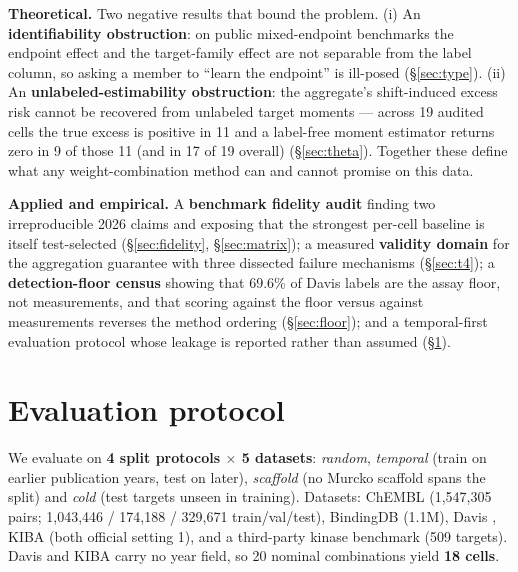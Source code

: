 \documentclass[10pt,letterpaper]{article}
\begin{document}
\smallskip
\noindent\textbf{Theoretical.} Two negative results that bound the problem.
(i) An \textbf{identifiability obstruction}: on public mixed-endpoint benchmarks the
endpoint effect and the target-family effect are not separable from the label column,
so asking a member to ``learn the endpoint'' is ill-posed
(\S\ref{sec:type}). (ii) An \textbf{unlabeled-estimability obstruction}: the
aggregate's shift-induced excess risk cannot be recovered from unlabeled target
moments --- across 19 audited cells the true excess is positive in 11 and a label-free
moment estimator returns zero in 9 of those 11 (and in 17 of 19 overall)
(\S\ref{sec:theta}). Together these define what any weight-combination method can and
cannot promise on this data.

\smallskip
\noindent\textbf{Applied and empirical.} A \textbf{benchmark fidelity audit} finding
two irreproducible 2026 claims and exposing that the strongest per-cell baseline is
itself test-selected (\S\ref{sec:fidelity}, \S\ref{sec:matrix}); a measured
\textbf{validity domain} for the aggregation guarantee with three dissected failure
mechanisms (\S\ref{sec:t4}); a \textbf{detection-floor census} showing that 69.6\% of
Davis labels are the assay floor, not measurements, and that scoring against the floor
versus against measurements reverses the method ordering (\S\ref{sec:floor}); and a
temporal-first evaluation protocol whose leakage is reported rather than assumed
(\S\ref{sec:protocol}).



\section{Evaluation protocol}
\label{sec:protocol}

We evaluate on \textbf{4 split protocols $\times$ 5 datasets}: \emph{random},
\emph{temporal} (train on earlier publication years, test on later), \emph{scaffold}
(no Murcko scaffold spans the split) and \emph{cold} (test targets unseen in
training). Datasets: ChEMBL \citep{gaulton2017} (1,547,305 pairs; 1,043,446 / 174,188 /
329,671 train/val/test), BindingDB \citep{liu2007,gilson2016} (1.1M), Davis
\citep{davis2011}, KIBA \citep{tang2014}
(both official setting 1), and a third-party kinase benchmark (509 targets). Davis
and KIBA carry no year field, so 20 nominal combinations yield \textbf{18 cells}.
\end{document}
